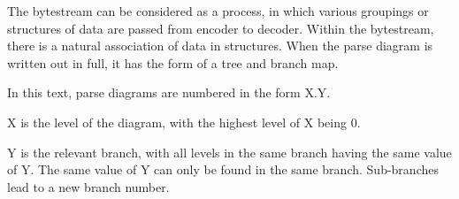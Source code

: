 The bytestream can be considered as a process, in which various
groupings or structures of data are passed from encoder to decoder.
Within the bytestream, there is a natural association of data in
structures. When the parse diagram is written out in full, it has the
form of a tree and branch map.

In this text, parse diagrams are numbered in the form X.Y.

X is the level of the diagram, with the highest level of X being 0.

Y is the relevant branch, with all levels in the same branch having the
same value of Y. The same value of Y can only be found in the same
branch. Sub-branches lead to a new branch number.
